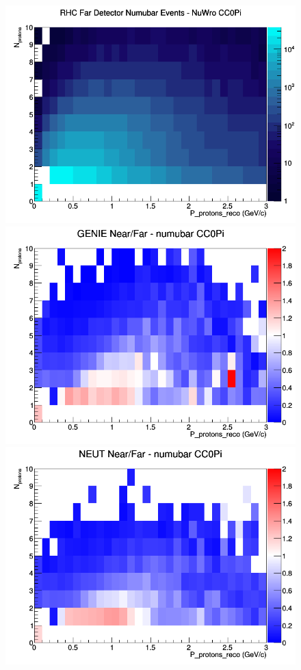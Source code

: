 \begin{figure}[h]
\endminipage
{}
\includegraphics[width=\linewidth]{eff_N_P/FGT/protons/CC0Pi_RHC_FD_numubar_N_P_NuWro.png}
\endminipage
\newline
{}
\includegraphics[width=\linewidth]{eff_N_P/FGT/protons/ratios/CC0Pi_GENIE_numubar_NF_N_P.png}
\endminipage
{}
\includegraphics[width=\linewidth]{eff_N_P/FGT/protons/ratios/CC0Pi_NEUT_numubar_NF_N_P.png}

\end{figure}
